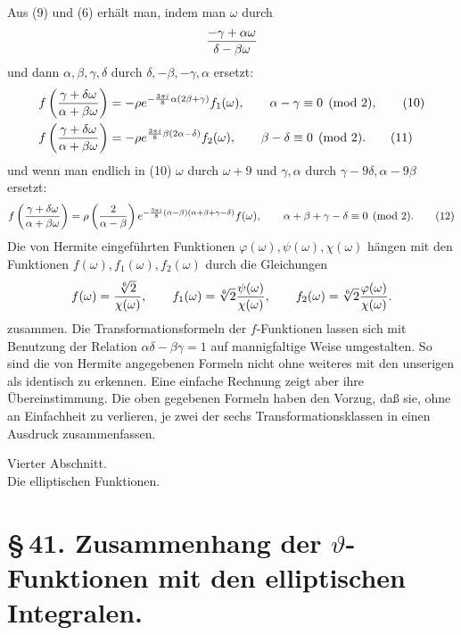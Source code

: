 \documentclass[11pt]{article}
\providecommand{\Jac}[2]{\left(\frac{#1}{#2}\right)}
\begin{document}
Aus (9) und (6) erhält man, indem man $\omega$ durch
\[
{-\gamma+
\alpha\omega\over\delta-
\beta\omega}
\]
und dann $\alpha,\beta,\gamma,\delta$ durch $\delta,-\beta,-\gamma,\alpha$ ersetzt:
\begin{align}
f\left({\gamma+
\delta\omega\over\alpha+
\beta\omega}\right)
&=-\rho e^{-\frac{3\pi i}{8}\alpha(2\beta+
\gamma)}f_1(\omega),
\qquad \alpha-
\gamma\equiv0\pmod2, \tag{10}\\
f\left({\gamma+
\delta\omega\over\alpha+
\beta\omega}\right)
&=-\rho e^{\frac{3\pi i}{8}\beta(2\alpha-
\delta)}f_2(\omega),
\qquad \beta-
\delta\equiv0\pmod2. \tag{11}
\end{align}
und wenn man endlich in (10) $\omega$ durch $\omega+9$ und $\gamma,
\alpha$ durch $\gamma-9\delta,
\alpha-9\beta$ ersetzt:
\begin{equation}
f\left({\gamma+
\delta\omega\over\alpha+
\beta\omega}\right)
=\rho\Jac{2}{\alpha-
\beta}e^{-\frac{3\pi i}{8}(\alpha-
\beta)(\alpha+
\beta+
\gamma-
\delta)}f(\omega),
\qquad \alpha+
\beta+
\gamma-
\delta\equiv0\pmod2. 
\tag{12}
\end{equation}
Die von Hermite eingeführten Funktionen $\varphi(\omega),\psi(\omega),\chi(\omega)$ hängen mit den Funktionen $f(\omega),f_1(\omega),f_2(\omega)$ durch die Gleichungen
\[
f(\omega)={\sqrt[6]{2}\over\chi(\omega)},
\qquad
f_1(\omega)=\sqrt[6]{2}{\psi(\omega)\over\chi(\omega)},
\qquad
f_2(\omega)=\sqrt[6]{2}{\varphi(\omega)\over\chi(\omega)}.
\]
zusammen. Die Transformationsformeln der $f$-Funktionen lassen sich mit Benutzung der Relation $\alpha\delta-\beta\gamma=1$ auf mannigfaltige Weise umgestalten. So sind die von Hermite angegebenen Formeln nicht ohne weiteres mit den unserigen als identisch zu erkennen. Eine einfache Rechnung zeigt aber ihre Übereinstimmung. Die oben gegebenen Formeln haben den Vorzug, daß sie, ohne an Einfachheit zu verlieren, je zwei der sechs Transformationsklassen in einen Ausdruck zusammenfassen.

\begin{center}
{\large Vierter Abschnitt.}\\[0.7em]
{\Large Die elliptischen Funktionen.}
\end{center}

\section*{\S\,41. Zusammenhang der $\vartheta$-Funktionen mit den elliptischen Integralen.}
\end{document}
